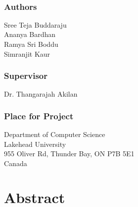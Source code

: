 \newpage
\thispagestyle{plain}
~\\
\vfill
{ 
	\subsection*{Authors}
	Sree Teja Buddaraju  \\ Ananya Bardhan \\
	Ramya Sri Boddu \\
	Simranjit Kaur \\

	\subsection*{Supervisor}
	Dr. Thangarajah Akilan\\
	
	\subsection*{Place for Project}
	Department of Computer Science\\
	Lakehead University\\
	955 Oliver Rd, Thunder Bay, ON P7B 5E1\\
	Canada
	~
	

}


\newpage
\thispagestyle{plain}
\chapter*{Abstract}


